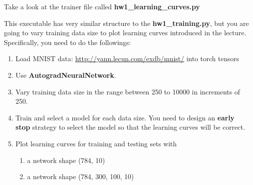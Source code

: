 \documentclass{article}
\newcommand{\homeworknumber}{1}
\begin{document}
\noindent Take a look at the trainer file called \textbf{hw\homeworknumber\_learning\_curves.py}

\hfill

\noindent This executable has very similar structure to the \textbf{hw\homeworknumber\_training.py}, but you are
going to vary training data size to plot learning curves introduced in the
lecture. Specifically, you need to do the followings:
\begin{enumerate}
  \item Load MNIST data: \url{http://yann.lecun.com/exdb/mnist/} into torch
        tensors
  \item Use \textbf{AutogradNeuralNetwork}.
  \item Vary training data size in the range between 250 to 10000 in increments of 250.
  \item Train and select a model for each data size. You need to design an \textbf{early
        stop} strategy to select the model so that the learning curves will be correct.
  \item Plot learning curves for training and testing sets with
    \begin{enumerate}
      \item a network shape (784, 10)
      \item a network shape (784, 300, 100, 10)
    \end{enumerate}
\end{enumerate}

\hfill
\newpage
\end{document}
